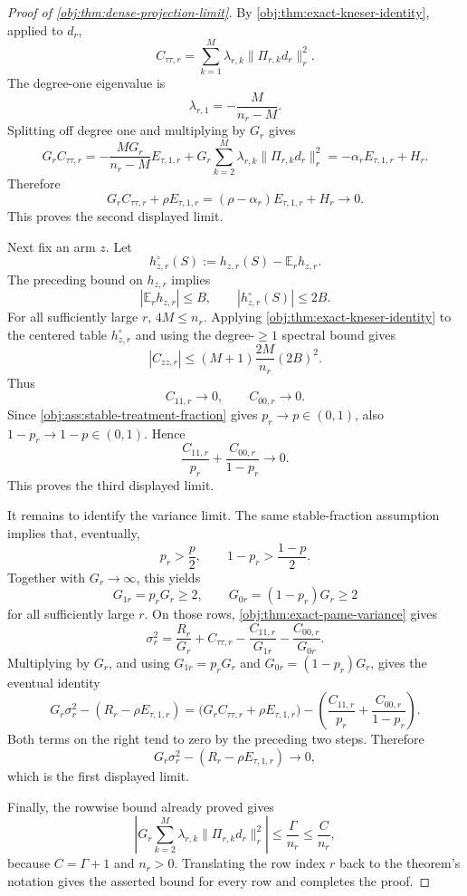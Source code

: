 \documentclass[11pt]{article}
\begin{document}
\begin{proof}[Proof of \cref{obj:thm:dense-projection-limit}]
By \cref{obj:thm:exact-kneser-identity}, applied to \(d_r\),
\[
C_{\tau\tau,r}
=
\sum_{k=1}^{M}\lambda_{r,k}\|\Pi_{r,k}d_r\|_r^2 .
\]
The degree-one eigenvalue is
\[
\lambda_{r,1}=-\frac{M}{n_r-M}.
\]
Splitting off degree one and multiplying by \(G_r\) gives
\[
G_rC_{\tau\tau,r}
=
-\frac{MG_r}{n_r-M}E_{\tau,1,r}
+
G_r\sum_{k=2}^{M}\lambda_{r,k}\|\Pi_{r,k}d_r\|_r^2
=
-\alpha_r E_{\tau,1,r}+H_r .
\]
Therefore
\[
G_rC_{\tau\tau,r}+\rho E_{\tau,1,r}
=
(\rho-\alpha_r)E_{\tau,1,r}+H_r
\to0 .
\]
This proves the second displayed limit.

Next fix an arm \(z\).  Let
\[
h_{z,r}^{\circ}(S):=h_{z,r}(S)-\mathbb E_r h_{z,r}.
\]
The preceding bound on \(h_{z,r}\) implies
\[
|\mathbb E_r h_{z,r}|\le B,
\qquad
|h_{z,r}^{\circ}(S)|\le2B .
\]
For all sufficiently large \(r\), \(4M\le n_r\).  Applying \cref{obj:thm:exact-kneser-identity} to the centered table \(h_{z,r}^{\circ}\) and using the degree-\(\ge1\) spectral bound gives
\[
|C_{zz,r}|
\le
(M+1)\frac{2M}{n_r}(2B)^2 .
\]
Thus
\[
C_{11,r}\to0,
\qquad
C_{00,r}\to0 .
\]
Since \cref{obj:ass:stable-treatment-fraction} gives \(p_r\to p\in(0,1)\), also \(1-p_r\to1-p\in(0,1)\).  Hence
\[
\frac{C_{11,r}}{p_r}
+
\frac{C_{00,r}}{1-p_r}
\to0 .
\]
This proves the third displayed limit.

It remains to identify the variance limit.  The same stable-fraction assumption implies that, eventually,
\[
p_r>\frac p2,
\qquad
1-p_r>\frac{1-p}{2}.
\]
Together with \(G_r\to\infty\), this yields
\[
G_{1r}=p_rG_r\ge2,
\qquad
G_{0r}=(1-p_r)G_r\ge2
\]
for all sufficiently large \(r\).  On those rows, \cref{obj:thm:exact-pame-variance} gives
\[
\sigma_r^2
=
\frac{R_r}{G_r}
+
C_{\tau\tau,r}
-
\frac{C_{11,r}}{G_{1r}}
-
\frac{C_{00,r}}{G_{0r}} .
\]
Multiplying by \(G_r\), and using \(G_{1r}=p_rG_r\) and \(G_{0r}=(1-p_r)G_r\), gives the eventual identity
\[
G_r\sigma_r^2-(R_r-\rho E_{\tau,1,r})
=
\bigl(G_rC_{\tau\tau,r}+\rho E_{\tau,1,r}\bigr)
-
\left(
\frac{C_{11,r}}{p_r}
+
\frac{C_{00,r}}{1-p_r}
\right).
\]
Both terms on the right tend to zero by the preceding two steps.  Therefore
\[
G_r\sigma_r^2-(R_r-\rho E_{\tau,1,r})\to0,
\]
which is the first displayed limit.

Finally, the rowwise bound already proved gives
\[
\left|
G_r\sum_{k=2}^{M}\lambda_{r,k}\|\Pi_{r,k}d_r\|_r^2
\right|
\le
\frac{\Gamma}{n_r}
\le
\frac{C}{n_r},
\]
because \(C=\Gamma+1\) and \(n_r>0\).  Translating the row index \(r\) back to the theorem's notation gives the asserted bound for every row and completes the proof.
\end{proof}
\end{document}
